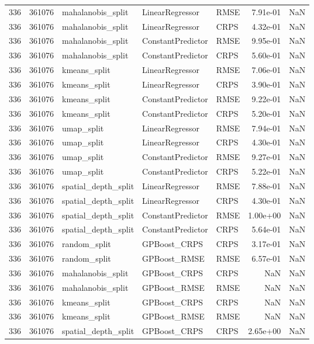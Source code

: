 \begin{tabular}{rrlllrr}
336 & 361076 & mahalanobis\_split & LinearRegressor & RMSE & 7.91e-01 & NaN \\
336 & 361076 & mahalanobis\_split & LinearRegressor & CRPS & 4.32e-01 & NaN \\
336 & 361076 & mahalanobis\_split & ConstantPredictor & RMSE & 9.95e-01 & NaN \\
336 & 361076 & mahalanobis\_split & ConstantPredictor & CRPS & 5.60e-01 & NaN \\
336 & 361076 & kmeans\_split & LinearRegressor & RMSE & 7.06e-01 & NaN \\
336 & 361076 & kmeans\_split & LinearRegressor & CRPS & 3.90e-01 & NaN \\
336 & 361076 & kmeans\_split & ConstantPredictor & RMSE & 9.22e-01 & NaN \\
336 & 361076 & kmeans\_split & ConstantPredictor & CRPS & 5.20e-01 & NaN \\
336 & 361076 & umap\_split & LinearRegressor & RMSE & 7.94e-01 & NaN \\
336 & 361076 & umap\_split & LinearRegressor & CRPS & 4.30e-01 & NaN \\
336 & 361076 & umap\_split & ConstantPredictor & RMSE & 9.27e-01 & NaN \\
336 & 361076 & umap\_split & ConstantPredictor & CRPS & 5.22e-01 & NaN \\
336 & 361076 & spatial\_depth\_split & LinearRegressor & RMSE & 7.88e-01 & NaN \\
336 & 361076 & spatial\_depth\_split & LinearRegressor & CRPS & 4.30e-01 & NaN \\
336 & 361076 & spatial\_depth\_split & ConstantPredictor & RMSE & 1.00e+00 & NaN \\
336 & 361076 & spatial\_depth\_split & ConstantPredictor & CRPS & 5.64e-01 & NaN \\
336 & 361076 & random\_split & GPBoost\_CRPS & CRPS & 3.17e-01 & NaN \\
336 & 361076 & random\_split & GPBoost\_RMSE & RMSE & 6.57e-01 & NaN \\
336 & 361076 & mahalanobis\_split & GPBoost\_CRPS & CRPS & NaN & NaN \\
336 & 361076 & mahalanobis\_split & GPBoost\_RMSE & RMSE & NaN & NaN \\
336 & 361076 & kmeans\_split & GPBoost\_CRPS & CRPS & NaN & NaN \\
336 & 361076 & kmeans\_split & GPBoost\_RMSE & RMSE & NaN & NaN \\
336 & 361076 & spatial\_depth\_split & GPBoost\_CRPS & CRPS & 2.65e+00 & NaN \\

\end{tabular}
